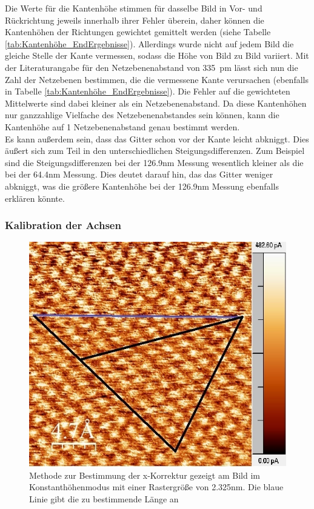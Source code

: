 \documentclass[12pt,a4paper]{article}
\begin{document}
Die Werte für die Kantenhöhe stimmen für dasselbe Bild in Vor- und Rückrichtung jeweils innerhalb ihrer Fehler überein, daher können die Kantenhöhen der Richtungen gewichtet gemittelt werden (siehe Tabelle \ref{tab:Kantenhöhe_EndErgebnisse}). Allerdings wurde nicht auf jedem Bild die gleiche Stelle der Kante vermessen, sodass die Höhe von Bild zu Bild variiert. Mit der Literaturangabe für den Netzebenenabstand von \SI{335}{pm} lässt sich nun die Zahl der Netzebenen bestimmen, die die vermessene Kante verursachen (ebenfalls in Tabelle \ref{tab:Kantenhöhe_EndErgebnisse}). Die Fehler auf die gewichteten Mittelwerte sind dabei kleiner als ein Netzebenenabstand. Da diese Kantenhöhen nur ganzzahlige Vielfache des Netzebenenabstandes sein können, kann die Kantenhöhe auf 1 Netzebenenabstand genau bestimmt werden.\\
Es kann außerdem sein, dass das Gitter schon vor der Kante leicht abkniggt. Dies äußert sich zum Teil in den unterschiedlichen Steigungsdifferenzen. Zum Beispiel sind die Steigungsdifferenzen bei der 126.9nm Messung wesentlich kleiner als die bei der 64.4nm Messung. Dies deutet darauf hin, das das Gitter weniger abkniggt, was die größere Kantenhöhe bei der 126.9nm Messung ebenfalls erklären könnte.

\subsubsection{Kalibration der Achsen}

\begin{figure}
\centering
\includegraphics[scale=0.8]{Bilder/Atome/hoch2_h_scale.jpg}
\caption{Methode zur Bestimmung der x-Korrektur gezeigt am Bild im Konstanthöhenmodus mit einer Rastergröße von 2.325nm. Die blaue Linie gibt die zu bestimmende Länge an}
\label{fig:hoch2_h}
\end{figure}
\end{document}
